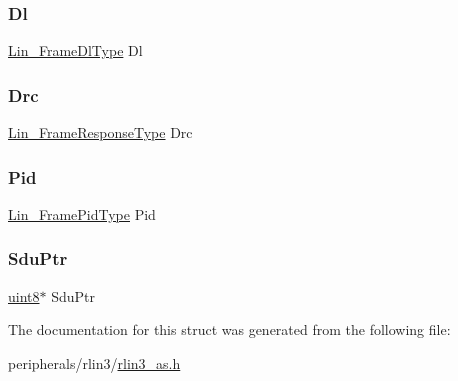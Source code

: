 \mbox{\label{struct_lin___pdu_type_a6aae2e73c9c9af39af956a51d1962557}} 
\subsubsection{\texorpdfstring{Dl}{Dl}}
{\footnotesize\ttfamily \mbox{\hyperlink{rlin3__as_8h_a3c23959006124180647bc24d62a976c2}{Lin\+\_\+\+Frame\+Dl\+Type}} Dl}

\mbox{\label{struct_lin___pdu_type_af7d159ff5319d6860e80fbda95487eb3}} 
\subsubsection{\texorpdfstring{Drc}{Drc}}
{\footnotesize\ttfamily \mbox{\hyperlink{rlin3__as_8h_a6e5feaa07b3570a91638a47f6ee3b8bd}{Lin\+\_\+\+Frame\+Response\+Type}} Drc}

\mbox{\label{struct_lin___pdu_type_a5313595b56f8a1b6dede131ac01e3d5e}} 
\subsubsection{\texorpdfstring{Pid}{Pid}}
{\footnotesize\ttfamily \mbox{\hyperlink{rlin3__as_8h_a80d617a47697e424c9d43c93cd94e41d}{Lin\+\_\+\+Frame\+Pid\+Type}} Pid}

\mbox{\label{struct_lin___pdu_type_a4e013762496e2e230972ba73f29f4ea6}} 
\subsubsection{\texorpdfstring{Sdu\+Ptr}{SduPtr}}
{\footnotesize\ttfamily \mbox{\hyperlink{rlin3__as_8h_a0a75bc6cad2d642d99f9f41545137f03}{uint8}}$\ast$ Sdu\+Ptr}



The documentation for this struct was generated from the following file\+:\begin{DoxyCompactItemize}
\item 
peripherals/rlin3/\mbox{\hyperlink{rlin3__as_8h}{rlin3\+\_\+as.\+h}}\end{DoxyCompactItemize}
